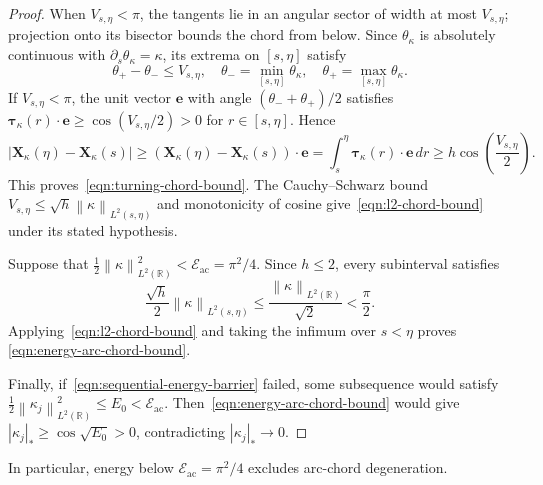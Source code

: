 \documentclass[11pt,reqno]{amsart}
\theoremstyle{plain}
\theoremstyle{definition}
\numberwithin{equation}{section}
\newcommand{\paren}[1]{\left(#1\right)}
\newcommand{\p}{\partial}
\newcommand{\mc}[1]{\mathcal{#1}}
\newcommand{\bm}[1]{\boldsymbol{#1}}
\newcommand{\abs}[1]{\left\lvert #1 \right\rvert}
\newcommand{\norm}[1]{\left\lVert #1 \right\rVert}
\newcommand{\R}{\mathbb{R}}
\newcommand{\tk}{\bm\tau_\kappa}
\newcommand{\xk}{\bm X_\kappa}
\begin{document}
\begin{proof}
When $V_{s,\eta}<\pi$, the tangents lie in an angular sector of width at
most $V_{s,\eta}$; projection onto its bisector bounds the chord from below.
Since $\theta_\kappa$ is absolutely continuous with
$\p_s\theta_\kappa=\kappa$, its extrema on $[s,\eta]$ satisfy
\begin{equation}
    \theta_+-\theta_-\le V_{s,\eta},
    \quad
    \theta_-=\min_{[s,\eta]}\theta_\kappa,
    \quad
    \theta_+=\max_{[s,\eta]}\theta_\kappa.
\end{equation}
If $V_{s,\eta}<\pi$, the unit vector $\bm e$ with angle
$(\theta_-+\theta_+)/2$ satisfies
$\tk(r)\cdot\bm e\ge\cos(V_{s,\eta}/2)>0$ for $r\in[s,\eta]$. Hence
\begin{equation}
    \abs{\xk(\eta)-\xk(s)}
    \ge\paren{\xk(\eta)-\xk(s)}\cdot\bm e
    =\int_s^\eta\tk(r)\cdot\bm e\,dr
    \ge h\cos\paren{\frac{V_{s,\eta}}2}.
\end{equation}
This proves~\eqref{eqn:turning-chord-bound}. The Cauchy--Schwarz bound
$V_{s,\eta}\le\sqrt h\norm{\kappa}_{L^2(s,\eta)}$ and monotonicity of cosine
give~\eqref{eqn:l2-chord-bound} under its stated hypothesis.

Suppose that
$\frac12\norm{\kappa}_{L^2(\R)}^2<\mc E_{\mathrm{ac}}=\pi^2/4$.
Since $h\le2$, every subinterval satisfies
\begin{equation}
    \frac{\sqrt h}{2}\norm{\kappa}_{L^2(s,\eta)}
    \le\frac{\norm{\kappa}_{L^2(\R)}}{\sqrt2}<\frac\pi2.
\end{equation}
Applying~\eqref{eqn:l2-chord-bound} and taking the infimum over $s<\eta$ proves
\eqref{eqn:energy-arc-chord-bound}.

Finally, if~\eqref{eqn:sequential-energy-barrier} failed, some subsequence
would satisfy $\frac12\norm{\kappa_j}_{L^2(\R)}^2\le E_0<\mc E_{\mathrm{ac}}$.
Then~\eqref{eqn:energy-arc-chord-bound} would give
$\abs{\kappa_j}_*\ge\cos\sqrt{E_0}>0$, contradicting
$\abs{\kappa_j}_*\to0$.
\end{proof}

In particular, energy below $\mc E_{\mathrm{ac}}=\pi^2/4$ excludes
arc-chord degeneration.
\end{document}
